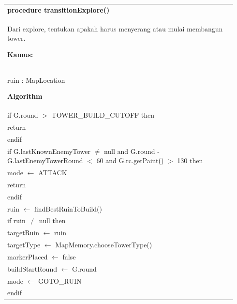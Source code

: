 \documentclass{article}
\newenvironment{pseudobox}
{
\centering
\begin{longtable}{|p{0.94\linewidth}|}
\hline
}
{
\\ \hline
\end{longtable}
\vspace{0.05cm}
}
\begin{document}
\begin{pseudobox}
\textbf{procedure transitionExplore()} \\
{ Dari explore, tentukan apakah harus menyerang atau mulai membangun tower. }

\textbf{Kamus:} \\
\hspace*{1em} ruin : MapLocation

\textbf{Algorithm} \\
\hspace*{1em} if G.round $>$ TOWER\_BUILD\_CUTOFF then \\
\hspace*{2em} return \\
\hspace*{1em} endif \\

\hspace*{1em} if G.lastKnownEnemyTower $\neq$ null and G.round - G.lastEnemyTowerRound $<$ 60 and G.rc.getPaint() $>$ 130 then \\
\hspace*{2em} mode $\leftarrow$ ATTACK \\
\hspace*{2em} return \\
\hspace*{1em} endif \\

\hspace*{1em} ruin $\leftarrow$ findBestRuinToBuild() \\

\hspace*{1em} if ruin $\neq$ null then \\
\hspace*{2em} targetRuin $\leftarrow$ ruin \\
\hspace*{2em} targetType $\leftarrow$ MapMemory.chooseTowerType() \\
\hspace*{2em} markerPlaced $\leftarrow$ false \\
\hspace*{2em} buildStartRound $\leftarrow$ G.round \\
\hspace*{2em} mode $\leftarrow$ GOTO\_RUIN \\
\hspace*{1em} endif
\end{pseudobox}
\end{document}
